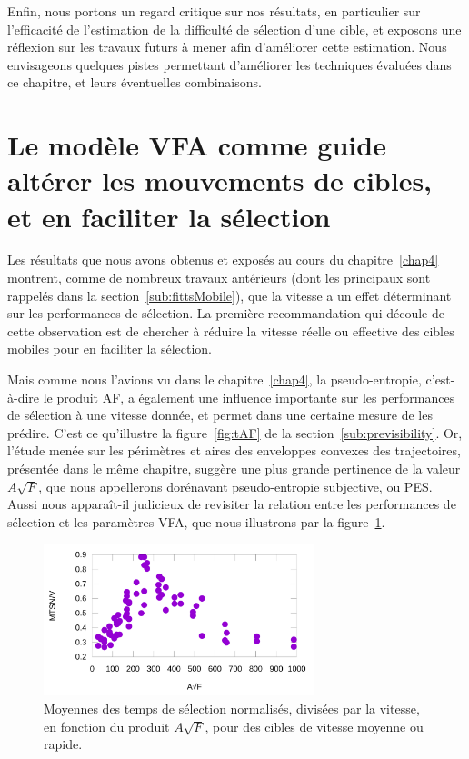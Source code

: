 	Enfin, nous portons un regard critique sur nos résultats, en particulier sur l'efficacité de l'estimation de la difficulté de sélection d'une cible, et exposons une réflexion sur les travaux futurs à mener afin d'améliorer cette estimation. Nous envisageons quelques pistes permettant d'améliorer les techniques évaluées dans ce chapitre, et leurs éventuelles combinaisons.
	
\section[VFA : guide pour altérer les mouvements de cibles]{Le modèle VFA comme guide altérer les mouvements de cibles, et en faciliter la sélection}
	\label{sub:vfaGuide}
	Les résultats que nous avons obtenus et exposés au cours du chapitre~\ref{chap4} montrent, comme de nombreux travaux antérieurs (dont les principaux sont rappelés dans la section~\ref{sub:fittsMobile}), que la vitesse a un effet déterminant sur les performances de sélection. La première recommandation qui découle de cette observation est de chercher à réduire la vitesse réelle ou effective des cibles mobiles pour en faciliter la sélection.

	Mais comme nous l'avions vu dans le chapitre~\ref{chap4}, la pseudo-entropie, c'est-à-dire le produit AF, a également une influence importante sur les performances de sélection à une vitesse donnée, et permet dans une certaine mesure de les prédire. C'est ce qu'illustre la figure~\ref{fig:tAF} de la section~\ref{sub:previsibility}. Or, l'étude menée sur les périmètres et aires des enveloppes convexes des trajectoires, présentée dans le même chapitre, suggère une plus grande pertinence de la valeur $A\sqrt{F}$, que nous appellerons dorénavant pseudo-entropie subjective, ou PES. Aussi nous apparaît-il judicieux de revisiter la relation entre les performances de sélection et les paramètres VFA, que nous illustrons par la figure~\ref{fig:tAsqrtF}.
	
	\begin{figure}[!htb]
		\centering
		\includegraphics[width=0.7\textwidth]{figures/ch5/asqrtFvTime}
		\caption[MTSN/V en fonction de $A\sqrt{F}$]{Moyennes des temps de sélection normalisés, divisées par la vitesse, en fonction du produit $A\sqrt{F}$, pour des cibles de vitesse moyenne ou rapide.}
		\label{fig:tAsqrtF}
	\end{figure}
	
